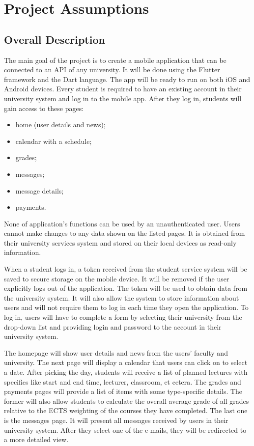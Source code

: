 \chapter{Project Assumptions}
\section{Overall Description}

The main goal of the project is to create a mobile application that can be connected to an API of any university. It will be done using the Flutter framework and the Dart language. The app will be ready to run on both iOS and Android devices. Every student is required to have an existing account in their university system and log in to the mobile app. After they log in, students will gain access to these pages:
\begin{multicols}{2}
\begin{itemize}
    \item home (user details and news);
    \item calendar with a schedule;
    \item grades;
    \item messages;
    \item message details;
    \item payments.
\end{itemize}
\end{multicols}
None of application's functions can be used by an unauthenticated user. Users cannot make changes to any data shown on the listed pages. It is obtained from their university services system and stored on their local devices as read-only information.

When a student logs in, a token received from the student service system will be saved to secure storage on the mobile device. It will be removed if the user explicitly logs out of the application. The token will be used to obtain data from the university system. It will also allow the system to store information about users and will not require them to log in each time they open the application. To log in, users will have to complete a form by selecting their university from the drop-down list and providing login and password to the account in their university system.

The homepage will show user details and news from the users' faculty and university. The next page will display a calendar that users can click on to select a date. After picking the day, students will receive a list of planned lectures with specifics like start and end time, lecturer, classroom, et cetera. The grades and payments pages will provide a list of items with some type-specific details. The former will also allow students to calculate the overall average grade of all grades relative to the ECTS weighting of the courses they have completed. The last one is the messages page. It will present all messages received by users in their university system. After they select one of the e-mails, they will be redirected to a more detailed view.

